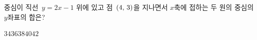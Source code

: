 중심이 직선~$y=2x-1$ 위에 있고 점~$(4,\mkern3mu 3)$을 지나면서 $x$축에 접하는 두 원의 중심의 $y$좌표의 합은?
\begin{choices32}{$34$}{$36$}{$38$}{$40$}{$42$}\end{choices32}
